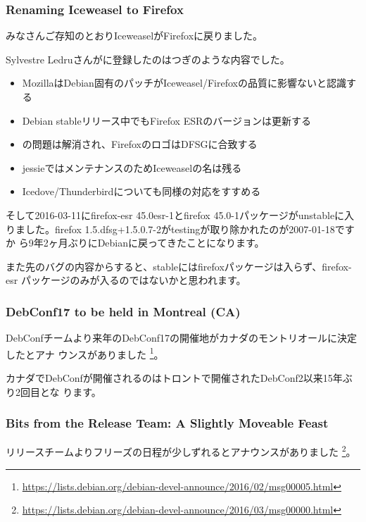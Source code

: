 \documentclass[mingoth,a4paper]{jsarticle}
\begin{document}
\subsubsection {Renaming Iceweasel to Firefox}

みなさんご存知のとおりIceweaselがFirefoxに戻りました。

Sylvestre Ledruさんがに登録したのはつぎのような内容でした。

\begin{itemize}
\item MozillaはDebian固有のパッチがIceweasel/Firefoxの品質に影響ないと認識する
\item Debian stableリリース中でもFirefox ESRのバージョンは更新する
\item {}の問題は解消され、FirefoxのロゴはDFSGに合致する
\item jessieではメンテナンスのためIceweaselの名は残る
\item Icedove/Thunderbirdについても同様の対応をすすめる
\end{itemize}

そして2016-03-11にfirefox-esr 45.0esr-1とfirefox 45.0-1パッケージがunstableに入
りました。firefox 1.5.dfsg+1.5.0.7-2がtestingが取り除かれたのが2007-01-18ですか
ら9年2ヶ月ぶりにDebianに戻ってきたことになります。

また先のバグの内容からすると、stableにはfirefoxパッケージは入らず、firefox-esr
パッケージのみが入るのではないかと思われます。

\subsubsection {DebConf17 to be held in Montreal (CA)}

DebConfチームより来年のDebConf17の開催地がカナダのモントリオールに決定したとアナ
ウンスがありました%
\footnote{\url{https://lists.debian.org/debian-devel-announce/2016/02/msg00005.html}}。

カナダでDebConfが開催されるのはトロントで開催されたDebConf2以来15年ぶり2回目とな
ります。

\subsubsection{Bits from the Release Team: A Slightly Moveable Feast}

リリースチームよりフリーズの日程が少しずれるとアナウンスがありました%
\footnote{\url{https://lists.debian.org/debian-devel-announce/2016/03/msg00000.html}}。
\end{document}
